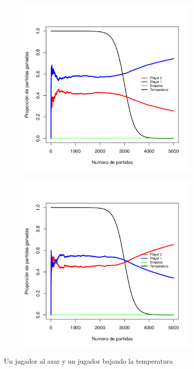 \documentclass[11pt, spanish]{article}
\begin{document}
\begin{figure}[H]
    \centering
    \begin{subfigure}[b]{0.45\textwidth}
      \includegraphics[width=\textwidth]{Imagenes/SinVision_disipacion_QsinVison}
    \end{subfigure}
    \begin{subfigure}[b]{0.45\textwidth}
      \includegraphics[width=\textwidth]{Imagenes/SinVision_disipacion_QsinVison_reverse}
    \end{subfigure}
    \caption{Un jugador al azar y un jugador bajando la temperatura}
\end{figure}
\end{document}

